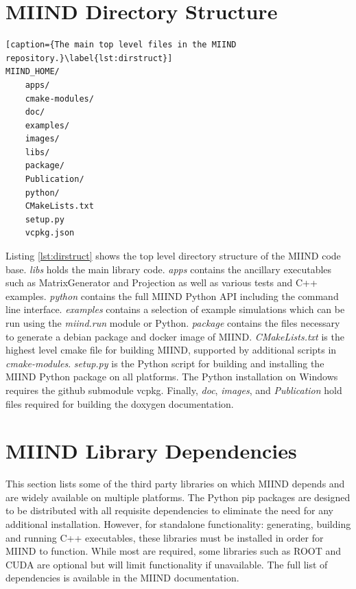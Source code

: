 \documentclass[utf8]{frontiers_suppmat} %
\begin{document}
\onecolumn
{}

\title[Supplementary Material]{{}}

\maketitle

\section {MIIND Directory Structure}
\label{directorystructure}

\begin{lstlisting}[caption={The main top level files in the MIIND repository.}\label{lst:dirstruct}]
MIIND_HOME/
    apps/
    cmake-modules/
    doc/
    examples/
    images/
    libs/
    package/
    Publication/
    python/
    CMakeLists.txt
    setup.py
    vcpkg.json
\end{lstlisting}

Listing \ref{lst:dirstruct} shows the top level directory structure of the MIIND code base. \textit{libs} holds the main library code. \textit{apps} contains the ancillary executables such as MatrixGenerator and Projection as well as various tests and C++ examples. \textit{python} contains the full MIIND Python API including the command line interface. \textit{examples} contains a selection of example simulations which can be run using the \textit{miind.run} module or Python. \textit{package} contains the files necessary to generate a debian package and docker image of MIIND. \textit{CMakeLists.txt} is the highest level cmake file for building MIIND, supported by additional scripts in \textit{cmake-modules}. \textit{setup.py} is the Python script for building and installing the MIIND Python package on all platforms. The Python installation on Windows requires the github submodule vcpkg. Finally, \textit{doc}, \textit{images}, and \textit{Publication} hold files required for building the doxygen documentation. 

\section{MIIND Library Dependencies}
\label{miinddependencies}
This section lists some of the third party libraries on which MIIND depends and are widely available on multiple platforms. The Python pip packages are designed to be distributed with all requisite dependencies to eliminate the need for any additional installation. However, for standalone functionality: generating, building and running C++ executables, these libraries must be installed in order for MIIND to function. While most are required, some libraries such as ROOT and CUDA are optional but will limit functionality if unavailable. The full list of dependencies is available in the MIIND documentation.
\end{document}

